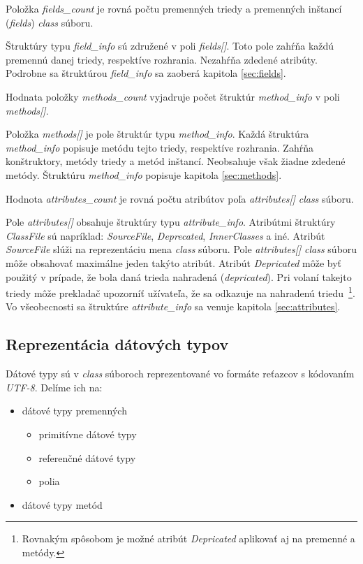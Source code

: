 \documentclass[11pt,final,oneside]{fithesis}
\begin{document}
Položka \textit{fields\_count} je rovná počtu premenných triedy a premenných
inštancí (\textit{fields}) \textit{class} súboru.

Štruktúry typu \textit{field\_info} sú združené v poli \textit{fields[]}. Toto
pole zahŕňa každú premennú danej triedy, respektíve rozhrania. Nezahŕňa
zdedené atribúty. Podrobne sa štruktúrou \textit{field\_info} sa zaoberá
kapitola \ref{sec:fields}.

Hodnata položky \textit{methods\_count} vyjadruje počet štruktúr
\textit{method\_info} v poli \textit{methods[]}.

Položka \textit{methods[]} je pole štruktúr typu \textit{method\_info}. Každá
štruktúra \textit{method\_info} popisuje metódu tejto triedy, respektíve
rozhrania. Zahŕňa konštruktory, metódy triedy a
metód inštancí. Neobsahuje však žiadne zdedené metódy. Štruktúru
\textit{method\_info} popisuje kapitola \ref{sec:methods}.

Hodnota \textit{attributes\_count} je rovná počtu atribútov poľa
\textit{attributes[]} \textit{class} súboru.

Pole \textit{attributes[]} obsahuje štruktúry typu \textit{attribute\_info}.
Atribútmi štruktúry \textit{ClassFile} sú napríklad: \textit{SourceFile},
\textit{Deprecated}, \textit{InnerClasses} a iné. Atribút \textit{SourceFile} 
slúži na reprezentáciu mena \textit{class} súboru. Pole \textit{attributes[]}
\textit{class} súboru môže obsahovať maximálne jeden takýto atribút. Atribút
\textit{Depricated} môže byť použitý v prípade, že bola daná trieda nahradená
(\textit{depricated}). Pri volaní takejto triedy môže prekladač upozorníť 
užívateľa, že sa odkazuje na nahradenú triedu~\footnote{Rovnakým spôsobom je
možné atribút \textit{Depricated} aplikovať aj na premenné a metódy.}. Vo
všeobecnosti sa štruktúre \textit{attribute\_info} sa venuje
kapitola \ref{sec:attributes}.

\subsection{Reprezentácia dátových typov}
\label{sec:descriptors}
Dátové typy sú v \textit{class} súboroch reprezentované vo formáte reťazcov
s kódovaním \textit{UTF-8}. Delíme ich na:
\begin{itemize}
\item dátové typy premenných
\begin{itemize}
\item primitívne dátové typy
\item referenčné dátové typy
\item polia
\end{itemize}
\item dátové typy metód
\end{itemize}
\end{document}
